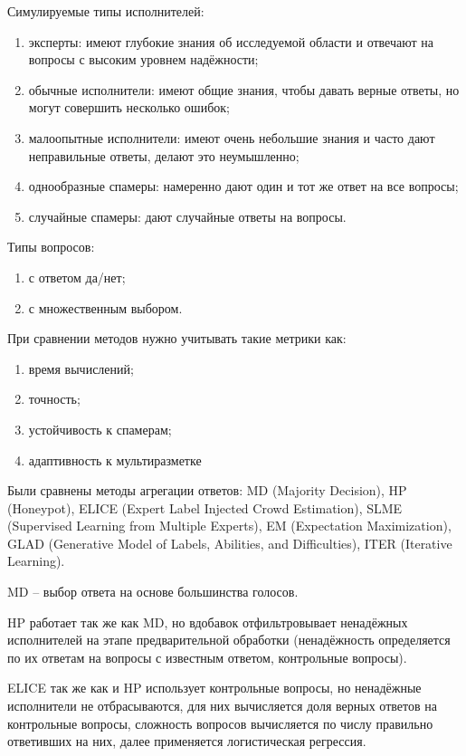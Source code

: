 \documentclass[specification,annotation,times]{itmo-student-thesis}
\begin{document}
Симулируемые типы исполнителей:
\begin{enumerate}
    \item эксперты: имеют глубокие знания об исследуемой области и отвечают на вопросы с высоким уровнем надёжности;
    \item обычные исполнители: имеют общие знания, чтобы давать верные ответы, но могут совершить несколько ошибок;
    \item малоопытные исполнители: имеют очень небольшие знания и часто дают неправильные ответы, делают это неумышленно;
    \item однообразные спамеры: намеренно дают один и тот же ответ на все вопросы;
    \item случайные спамеры: дают случайные ответы на вопросы.
\end{enumerate}
Типы вопросов:
\begin{enumerate}
    \item с ответом да/нет;
    \item с множественным выбором.
\end{enumerate}
При сравнении методов нужно учитывать такие метрики как:
\begin{enumerate}
    \item время вычислений;
    \item точность;
    \item устойчивость к спамерам;
    \item адаптивность к мультиразметке
\end{enumerate}

Были сравнены методы агрегации ответов: MD (Majority Decision), HP (Honeypot), ELICE (Expert Label Injected Crowd Estimation), SLME (Supervised Learning from Multiple Experts), EM (Expectation Maximization), GLAD (Generative Model of Labels, Abilities, and Difficulties), ITER (Iterative Learning).

MD – выбор ответа на основе большинства голосов.

HP работает так же как MD, но вдобавок отфильтровывает ненадёжных исполнителей на этапе предварительной обработки (ненадёжность определяется по их ответам на вопросы с известным ответом, контрольные вопросы).

ELICE так же как и HP использует контрольные вопросы, но ненадёжные исполнители не отбрасываются, для них вычисляется доля верных ответов на контрольные вопросы, сложность вопросов вычисляется по числу правильно ответивших на них, далее применяется логистическая регрессия.
\end{document}
